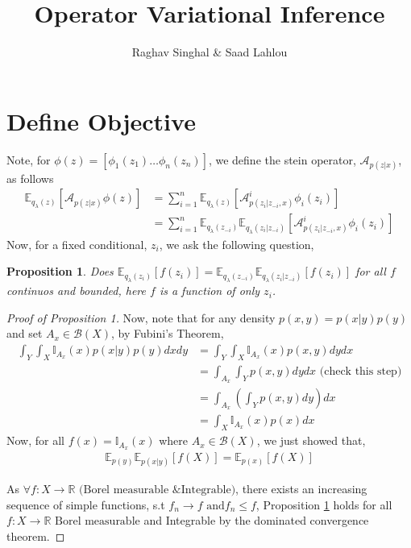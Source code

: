\documentclass[12pt,twoside]{article}
\newtheorem{prop}{Proposition}
\begin{document}
\title{Operator Variational Inference}

\author{Raghav Singhal \& Saad Lahlou}

\maketitle

\section{Define Objective}

Note, for $\phi(z) = [ \phi_{1}(z_{1}) \dots \phi_{n}(z_n) ]$, we define the stein operator, $\mathcal{A}_{p(z|x)}$, as follows
\begin{align}
\mathbb{E}_{q_{\lambda}(z)}[ \mathcal{A}_{p(z | x)} \phi(z) ] &= \sum_{i=1}^{n}\mathbb{E}_{q_{\lambda}(z)}[ \mathcal{A}^{i}_{p(z_i | z_{-i}, x)} \phi_i(z_i) ]  \\
&= \sum_{i=1}^{n}\mathbb{E}_{q_{\lambda}(z_{-i})} \mathbb{E}_{q_{\lambda}(z_{i}| z_{-i})} [ \mathcal{A}^{i}_{p(z_i | z_{-i}, x)} \phi_i(z_i) ]
\end{align}
Now, for a fixed conditional, $z_i$, we ask the following question,

\begin{prop}\label{simplify}
Does $\mathbb{E}_{q_{\lambda}(z_i)}[ f(z_i) ] = \mathbb{E}_{q_{\lambda}(z_{-i})} \mathbb{E}_{q_{\lambda}(z_{i}| z_{-i})}[ f(z_i) ] $ for all $f$ continuos and bounded, here $f$ is a function of only $z_i$.
\end{prop}



\begin{proof}[Proof of Proposition 1]
Now, note that for any density $p(x,y) = p(x|y)p(y)$ and set $A_x \in \mathcal{B}(X) $, by Fubini's Theorem,
\begin{align*}
\int_{Y} \int_{X} \mathbb{I}_{A_x}(x) p(x|y)p(y) dx dy &= \int_{Y} \int_{X} \mathbb{I}_{A_x}(x) p(x,y) dy dx \\
&= \int_{A_{x}} \int_{Y} p(x,y) dy dx \text{  (check this step)}\\
&= \int_{A_{x}} (\int_{Y} p(x,y) dy ) dx  \\
& = \int_{X} \mathbb{I}_{A_x}(x) p(x) dx
\end{align*}
Now, for all $f(x) = \mathbb{I}_{A_x}(x)$ where $A_{x} \in \mathcal{B}(X)$, we just showed that,
\begin{align}
\mathbb{E}_{p(y)} \mathbb{E}_{p(x|y)}[ f(X) ] = \mathbb{E}_{p(x)}[ f(X)]
\end{align}

As $\forall f: X \rightarrow \mathbb{R} \text{ (Borel measurable \& Integrable)}$, there exists an increasing sequence of simple functions, s.t $f_{n} \rightarrow f \text{ and} f_{n} \leq f $, Proposition \ref{simplify} holds for all $f: X \rightarrow \mathbb{R} \text{ Borel measurable}$ and Integrable by the dominated convergence theorem.

\end{proof}
\end{document}
